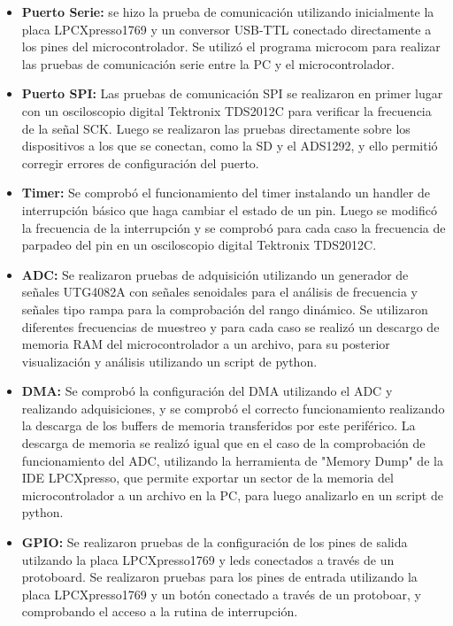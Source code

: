 \begin{itemize}

\item \textbf{Puerto Serie:} se hizo la prueba de comunicación utilizando inicialmente la placa LPCXpresso1769 y un conversor USB-TTL conectado directamente a los pines del microcontrolador. Se utilizó el programa microcom \citep{ubuntu2016} para realizar las pruebas de comunicación serie entre la PC y el microcontrolador.

\item \textbf{Puerto SPI:} Las pruebas de comunicación SPI se realizaron en primer lugar con un osciloscopio digital Tektronix TDS2012C para verificar la frecuencia de la señal SCK. Luego se realizaron las pruebas directamente sobre los dispositivos a los que se conectan, como la SD y el ADS1292, y ello permitió corregir errores de configuración del puerto.

\item \textbf{Timer:} Se comprobó el funcionamiento del timer instalando un handler de interrupción básico que haga cambiar el estado de un pin. Luego se modificó la frecuencia de la interrupción y se comprobó para cada caso la frecuencia de parpadeo del pin en un osciloscopio digital Tektronix TDS2012C.

\item \textbf{ADC:} Se realizaron pruebas de adquisición utilizando un generador de señales UTG4082A con señales senoidales para el análisis de frecuencia y señales tipo rampa para la comprobación del rango dinámico. Se utilizaron diferentes frecuencias de muestreo y para cada caso se realizó un descargo de memoria RAM del microcontrolador a un archivo, para su posterior visualización y análisis utilizando un script de python.

\item \textbf{DMA:} Se comprobó la configuración del DMA utilizando el ADC y realizando adquisiciones, y se comprobó el correcto funcionamiento realizando la descarga de los buffers de memoria transferidos por este periférico. La descarga de memoria se realizó igual que en el caso de la comprobación de funcionamiento del ADC, utilizando la herramienta de "Memory Dump" de la IDE LPCXpresso, que permite exportar un sector de la memoria del microcontrolador a un archivo en la PC, para luego analizarlo en un script de python.

\item \textbf{GPIO:} Se realizaron pruebas de la configuración de los pines de salida utilzando la placa LPCXpresso1769 y leds conectados a través de un protoboard. Se realizaron pruebas para los pines de entrada utilizando la placa LPCXpresso1769 y un botón conectado a través de un protoboar, y comprobando el acceso a la rutina de interrupción.


\end{itemize}
